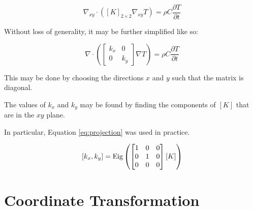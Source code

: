 \begin{equation}
\nabla_{xy} \cdot \left([K]_{2 \times 2}\nabla_{xy} T \right)= \rho C\frac{\partial T}{\partial t}
\end{equation}

Without loss of generality, it may be further simplified like so:

\begin{equation}
\nabla \cdot \left(\begin{bmatrix}k_x & 0\\ 0 & k_y\end{bmatrix}\nabla T \right)= \rho C\frac{\partial T}{\partial t}
\end{equation}

This may be done by choosing the directions \(x\) and \(y\) such that the
matrix is diagonal.

The values of \(k_x\) and \(k_y\) may be found by finding the components of
\([K]\) that are in the \(xy\) plane.

In particular, Equation \ref{eq:projection} was used in practice.

\begin{equation}
\label{eq:projection}
\left[ k_x, k_y \right] = 
\textrm{Eig}\left(\begin{bmatrix} 1 & 0 & 0 \\ 0 & 1 & 0\\ 0 & 0 & 0\end{bmatrix}
\left[K\right]\right)
\end{equation}

\section{Coordinate Transformation}
\label{sec:analytical-np:transformation}

